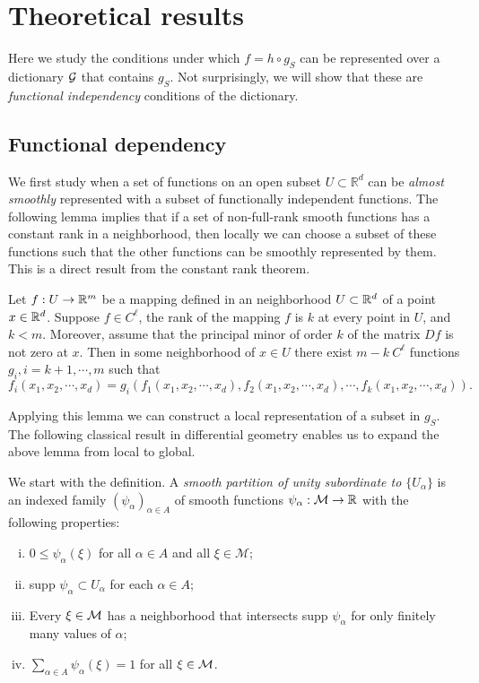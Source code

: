 \section{Theoretical results}
\label{sec:theory}

Here we study the conditions under which $f=h\circ g_S$ can be represented over a dictionary ${\cal G}$ that contains $g_S$. Not
surprisingly, we will show that these are \emph{functional independency}
conditions of the dictionary.

\subsection{Functional dependency}
\label{sec:existence}

We first study when a set of functions on an open subset
$U\subset\mathbb{R}^d$ can be \emph{almost smoothly} represented with a subset of
functionally independent functions. The following lemma implies that
if a set of non-full-rank smooth functions has a constant rank in a
neighborhood, then locally we can choose a
subset of these functions such that the other functions can be smoothly
represented by them. This is a direct result from the constant rank
theorem.

\begin{lemma}
Let $f:U\rightarrow {\mathbb R}^m$ be a mapping defined in an neighborhood
$U\subset {\mathbb R}^d$ of a point $x\in {\mathbb R}^d$. Suppose $f\in C^\ell$, the rank
of the mapping $f$ is $k$ at every point in $U$, and
$k<m$. Moreover, assume that the principal minor of order $k$ of the
matrix $Df$ is not zero at $x$. Then in some neighborhood of $x\in U$ there
exist $m-k \ C^\ell$ functions $g_i,i=k+1,\cdots,m$ such that
\begin{equation}
 	f_i(x_1,x_2,\cdots,x_d) = g_i(f_1(x_1,x_2,\cdots,x_d),f_2(x_1,x_2,\cdots,x_d),\cdots,f_k(x_1,x_2,\cdots,x_d)).
 \end{equation} 
 \label{lem:representation}
\end{lemma}

Applying this lemma we can construct a local representation of a
subset in $g_S$. The following classical result in differential
geometry enables us to expand the above lemma from local to global.

We start with the definition. A {\em smooth partition of unity subordinate to $\{U_\alpha\}$} is an indexed family $(\psi_\alpha)_{\alpha\in A}$ of smooth functions $\psi_\alpha:\mathcal{M}\rightarrow {\mathbb R}$ with the following properties:
\begin{enumerate}[(i)]
	\item $0\leq \psi_\alpha(\xi)$ for all $\alpha \in A$ and all $\xi\in \mathcal{M}$;
	\item supp $\psi_\alpha \subset U_\alpha$ for each $\alpha\in A$;
	\item Every $\xi\in{\cal M}$ has a neighborhood that intersects supp $\psi_\alpha$ for only finitely many values of $\alpha$;
	\item $\sum_{\alpha \in A}\psi_{\alpha}(\xi)=1$ for all $\xi\in {\cal M}$.
\end{enumerate}


